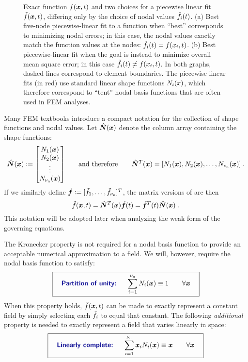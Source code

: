 \begin{figure}
\caption{Exact function $f(\bm{x},t)$ and two choices for a piecewise linear fit $\tilde{f}(\bm{x},t)$, differing only by the choice of nodal values $\tilde{f}_i(t)$. (a) Best five-node piecewise-linear fit to a function when ``best'' corresponds to minimizing nodal errors; in this case, the nodal values exactly match the function values at the nodes: $\tilde{f}_i({t})=f(x_i,{t})$. (b) Best piecewise-linear fit when the goal is instead to minimize overall mean square error; in this case $\tilde{f}_i({t})\ne f(x_i,{t})$.  In both graphs, dashed lines correspond to element boundaries. The piecewise linear fits (in red) use standard linear shape functions ${N}_i(x)$, which therefore correspond to ``tent'' nodal basis functions that are often used in FEM analyses.}
\label{fig:LinearFitNotInterpolation}
\end{figure}

Many FEM textbooks introduce a compact notation for the collection of shape functions and nodal values. Let $\hat{\bm{N}}(\bm{x})$ denote the column array containing the shape functions:
\begin{equation}
  \hat{\bm{N}}(\bm{x}):=
{\begin{bmatrix}{\ensuremath{N}}_1(\bm{x}) \\ {N}_2(\bm{x})  \\ \vdots  \\  {N}_{\nu_\text{n}}(\bm{x}) \end{bmatrix}}
\qquad\text{and therefore}\qquad
\hat{\bm{N}}^T(\bm{x})=[{N}_1(\bm{x}),{N}_2(\bm{x}),\ldots,{N}_{\nu_\text{n}}(\bm{x})]\;.
\label{eq:ArrayNBFa}
\end{equation}
If we similarly define $\hat{\bm{f}}:=[\tilde{f}_1,\ldots,\tilde{f}_{\nu_\text{n}}]^T$, the matrix versions of  are then
\begin{equation}
  \tilde{f}(\bm{x},{t})=\hat{\bm{N}}^T(\bm{x})\hat{\bm{f}}(t)=\hat{\bm{f}}^T(t)\hat{\bm{N}}(\bm{x})\;.
\label{eq:fieldOnGrida}
\end{equation}
This notation will be adopted later when analyzing the weak form of the governing equations. 

The Kronecker property is not required for a nodal basis function to provide an acceptable numerical approximation to a field. We will, however, require the nodal basis function to satisfy:
\begin{equation}
  \boxit{\quad
\text{\Defn{Partition of unity: }}\quad
\sum\limits_{i=1}^{\numnodes} \NBF_i(\x)\equiv 1\qquad\forall\x
\quad}
\label{eq:PartitionOfUnity}
\end{equation}
When this property holds, $\tilde{f}(\bm{x},t)$ can be made to exactly represent a constant field by simply selecting each $\tilde{f}_i$ to equal that constant. 
The following \textit{additional} property is needed to exactly represent a field that varies linearly in space:
\begin{equation}
  \boxit{\quad
\text{\Defn{Linearly complete: }}\quad
\sum\limits_{i=1}^{\numnodes} \x_i\NBF_i(\x)\equiv \x\qquad\forall\x
\quad}
\label{eq:LinearlyComplete}
\end{equation}




